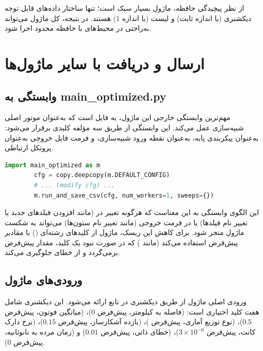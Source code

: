 از نظر پیچیدگی حافظه، ماژول بسیار سبک است؛ تنها ساختار داده‌های قابل توجه دیکشنری  (با اندازه ثابت) و لیست  (با اندازه $1$) هستند. در نتیجه، کل ماژول می‌تواند به‌راحتی در محیط‌های با حافظه محدود اجرا شود.

\section{ارسال و دریافت با سایر ماژول‌ها}

\subsection{وابستگی به main\_optimized.py}

مهم‌ترین وابستگی خارجی این ماژول، به فایل  است که به‌عنوان موتور اصلی شبیه‌سازی عمل می‌کند. این وابستگی از طریق سه مؤلفه کلیدی برقرار می‌شود:  به‌عنوان پیکربندی پایه،  به‌عنوان نقطه ورود شبیه‌سازی، و فرمت فایل  خروجی به‌عنوان پروتکل ارتباطی.

\begin{LTR}
	\begin{lstlisting}[language=Python]
		import main_optimized as m
		cfg = copy.deepcopy(m.DEFAULT_CONFIG)
		# ... (modify cfg) ...
		m.run_and_save_csv(cfg, num_workers=1, sweeps={})
	\end{lstlisting}
\end{LTR}

این الگوی وابستگی به این معناست که هرگونه تغییر در  (مانند افزودن فیلدهای جدید یا تغییر نام فیلدها) یا در فرمت خروجی  (مانند تغییر نام ستون‌ها) می‌تواند به شکست ماژول  منجر شود. برای کاهش این ریسک، ماژول از کلیدهای رشته‌ای () با مقادیر پیش‌فرض استفاده می‌کند (مانند ) که در صورت نبود یک کلید، مقدار پیش‌فرض برمی‌گردد و از خطای  جلوگیری می‌کند.

\subsection{ورودی‌های ماژول}

ورودی اصلی ماژول از طریق دیکشنری  در تابع  ارائه می‌شود. این دیکشنری شامل هفت کلید اختیاری است:  (فاصله به کیلومتر، پیش‌فرض $0$)،  (میانگین فوتون، پیش‌فرض $0.5$)،  (نوع توزیع آماری، پیش‌فرض )،  (بازده آشکارساز، پیش‌فرض $0.15$)،  (نرخ دارک کانت، پیش‌فرض $3 \times 10^{-6}$)،  (خطای ذاتی، پیش‌فرض $0.01$) و  (زمان مرده به نانوثانیه، پیش‌فرض $0$).

